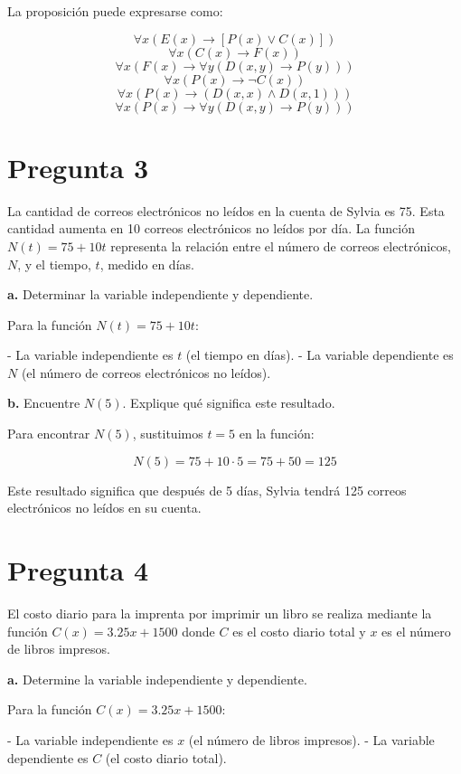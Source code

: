 \documentclass{article}
\begin{document}
La proposición puede expresarse como:

\[ \forall x (E(x) \rightarrow [P(x) \lor C(x)]) \]
\[ \forall x (C(x) \rightarrow F(x)) \]
\[ \forall x (F(x) \rightarrow \forall y (D(x, y) \rightarrow P(y))) \]
\[ \forall x (P(x) \rightarrow \neg C(x)) \]
\[ \forall x (P(x) \rightarrow (D(x, x) \land D(x, 1))) \]
\[ \forall x (P(x) \rightarrow \forall y (D(x, y) \rightarrow P(y))) \]

\section*{Pregunta 3}

La cantidad de correos electrónicos no leídos en la cuenta de Sylvia es 75. Esta cantidad aumenta en 10 correos electrónicos no leídos por día. La función \( N(t) = 75 + 10t \) representa la relación entre el número de correos electrónicos, \( N \), y el tiempo, \( t \), medido en días.

\textbf{a.} Determinar la variable independiente y dependiente.

Para la función \( N(t) = 75 + 10t \):

- La variable independiente es \( t \) (el tiempo en días).
- La variable dependiente es \( N \) (el número de correos electrónicos no leídos).

\textbf{b.} Encuentre \( N(5) \). Explique qué significa este resultado.

Para encontrar \( N(5) \), sustituimos \( t = 5 \) en la función:

\[ N(5) = 75 + 10 \cdot 5 = 75 + 50 = 125 \]

Este resultado significa que después de 5 días, Sylvia tendrá 125 correos electrónicos no leídos en su cuenta.

\section*{Pregunta 4}

El costo diario para la imprenta por imprimir un libro se realiza mediante la función \( C(x) = 3.25x + 1500 \) donde \( C \) es el costo diario total y \( x \) es el número de libros impresos.

\textbf{a.} Determine la variable independiente y dependiente.

Para la función \( C(x) = 3.25x + 1500 \):

- La variable independiente es \( x \) (el número de libros impresos).
- La variable dependiente es \( C \) (el costo diario total).
\end{document}
